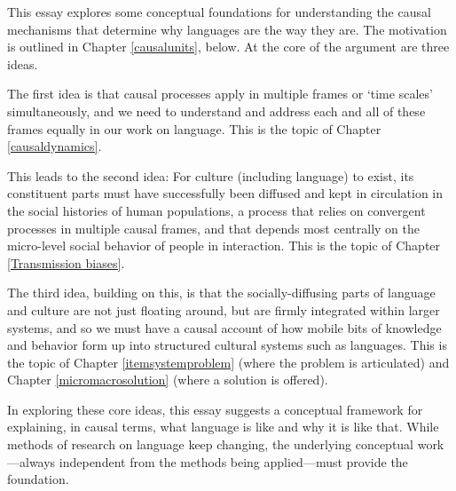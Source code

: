 



This essay explores some conceptual foundations for understanding the causal mechanisms that determine why languages are the way they are. The motivation is outlined in Chapter \ref{causalunits}, below. At the core of the argument are three ideas. 

The first idea is that causal processes apply in multiple frames or \textquoteleft time scales’ simultaneously, and we need to understand and address each and all of these frames equally in our work on language. This is the topic of Chapter \ref{causaldynamics}. 

This leads to the second idea: For culture (including language) to exist, its constituent parts must have successfully been diffused and kept in circulation in the social histories of human populations, a process that relies on convergent processes in multiple causal frames, and that depends most centrally on the micro-level social behavior of people in interaction. This is the topic of Chapter \ref{Transmission biases}. 

The third idea, building on this, is that the socially-diffusing parts of language and culture are not just floating around, but are firmly integrated within larger systems, and so we must have a causal account of how mobile bits of knowledge and behavior form up into structured cultural systems such as languages. This is the topic of Chapter \ref{itemsystemproblem} (where the problem is articulated) and Chapter \ref{micromacrosolution} (where a solution is offered). 

In exploring these core ideas, this essay suggests a conceptual framework for explaining, in causal terms, what language is like and why it is like that. While methods of research on language keep changing, the underlying conceptual work---always independent from the methods being applied---must provide the foundation.
